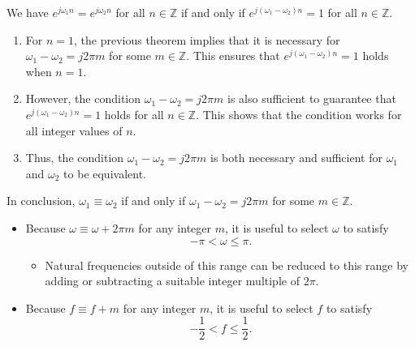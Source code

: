     \begin{derivation}
        We have \(e^{j \omega_1 n} = e^{j \omega_2 n}\) for all \(n \in \mathbb{Z}\) if and only if \(e^{j (\omega_1 - \omega_2) n} = 1\) for all \(n \in \mathbb{Z}\). 
        
        \begin{enumerate}
            \item For \(n = 1\), the previous theorem implies that it is necessary for \(\omega_1 - \omega_2 = j 2\pi m\) for some \(m \in \mathbb{Z}\). This ensures that \(e^{j (\omega_1 - \omega_2) n} = 1\) holds when \(n = 1\).
            
            \item However, the condition \(\omega_1 - \omega_2 = j 2\pi m\) is also sufficient to guarantee that \(e^{j (\omega_1 - \omega_2) n} = 1\) holds for all \(n \in \mathbb{Z}\). This shows that the condition works for all integer values of \(n\).
            
            \item Thus, the condition \(\omega_1 - \omega_2 = j 2\pi m\) is both necessary and sufficient for \(\omega_1\) and \(\omega_2\) to be equivalent.
        \end{enumerate}
        
        In conclusion, \(\omega_1 \equiv \omega_2\) if and only if \(\omega_1 - \omega_2 = j 2\pi m\) for some \(m \in \mathbb{Z}\).
    \end{derivation}

    \begin{intuition}
        \begin{itemize}
            \item Because \(\omega \equiv \omega + 2\pi m\) for any integer \(m\), it is useful to select \(\omega\) to satisfy
            \[
            -\pi < \omega \leq \pi.
            \]
            \begin{itemize}
                \item Natural frequencies outside of this range can be reduced to this range by adding or subtracting a suitable integer multiple of \(2\pi\).
            \end{itemize}
            
            \item Because \(f \equiv f + m\) for any integer \(m\), it is useful to select \(f\) to satisfy
            \[
            -\frac{1}{2} < f \leq \frac{1}{2}.
            \]
        \end{itemize}        
    \end{intuition}

